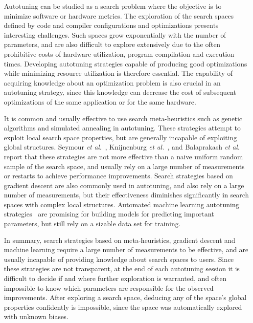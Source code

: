 \documentclass[conference]{IEEEtran}
\begin{document}
Autotuning can be studied as a search problem where the objective is to minimize
software or  hardware metrics. The exploration  of the search spaces  defined by
code  and   compiler  configurations  and  optimizations   presents  interesting
challenges. Such  spaces grow exponentially  with the number of  parameters, and
are also difficult to explore extensively  due to the often prohibitive costs of
hardware  utilization,  program  compilation  and  execution  times.  Developing
autotuning strategies  capable of producing good  optimizations while minimizing
resource  utilization  is  therefore  essential.  The  capability  of  acquiring
knowledge  about  an optimization  problem  is  also  crucial in  an  autotuning
strategy, since this knowledge can decrease the cost of subsequent optimizations
of the same application or for the same hardware.

It is common and usually effective to use search meta-heuristics such as genetic
algorithms and  simulated annealing in  autotuning. These strategies  attempt to
exploit local search space properties, but are generally incapable of exploiting
global    structures.    Seymour   \emph{et    al.}~\cite{seymour2008comparison},
Knijnenburg  \emph{et  al.}~\cite{knijnenburg2003combined},  and  Balaprakash  \emph{et
al.}~\cite{balaprakash2011can,balaprakash2012experimental}    report   that
these strategies  are not more effective  than a naive uniform  random sample of
the search space, and usually rely on a large number of measurements or restarts
to achieve performance improvements. Search strategies based on gradient descent
are  also commonly  used in  autotuning,  and also  rely  on a  large number  of
measurements, but their effectiveness  diminishes significantly in search spaces
with   complex  local   structures.   Automated   machine  learning   autotuning
strategies~\cite{beckingsale2017apollo,falch2017machine,balaprakash2016automomml}
are promising for building models for predicting important parameters, but still
rely on a sizable data set for training.

In summary,  search strategies  based on  meta-heuristics, gradient  descent and
machine learning require a large number of measurements to be effective, and are
usually incapable  of providing  knowledge about search  spaces to  users. Since
these strategies are  not transparent, at the end of  each autotuning session it
is difficult to decide if and  where further exploration is warranted, and often
impossible  to   know  which  parameters   are  responsible  for   the  observed
improvements. After exploring a search space, deducing any of the space's global
properties confidently is impossible, since the space was automatically explored
with unknown biases.
\end{document}
